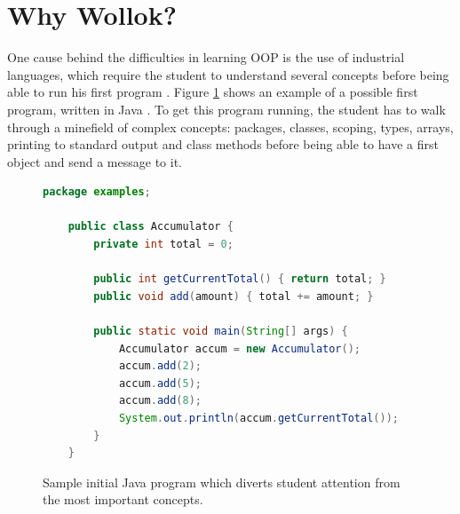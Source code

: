 \section{Why Wollok?}
\label{sec:problem}


One cause behind the difficulties in learning OOP is the use of industrial languages, which require the student to understand several concepts before being able to run his first program \cite{kolling_problem_1999}.
Figure \ref{fig:helloWorld} shows an example of a possible first program, written in Java \cite{arnold_java_1996}.
To get this program running, the student has to walk through a minefield of complex concepts: packages, classes, scoping, types, arrays, printing to standard output and class methods 
before being able to have a first object and send a message to it.

\vspace{-3mm}
\begin{figure}[ht]
 \centering
 \begin{lstlisting}[language=Java]
	package examples;
	
	public class Accumulator {
		private int total = 0;
		
		public int getCurrentTotal() { return total; }
		public void add(amount) { total += amount; }

		public static void main(String[] args) {
			Accumulator accum = new Accumulator();
			accum.add(2);
			accum.add(5);
			accum.add(8);
			System.out.println(accum.getCurrentTotal());
		}
	}\end{lstlisting}
\vspace{-3mm}
\caption{Sample initial Java program which diverts student attention from the most important concepts.}
\label{fig:helloWorld}
\end{figure}
\vspace{-3mm}

